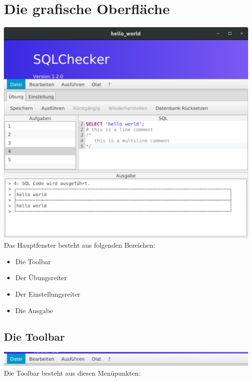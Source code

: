 \documentclass[11pt]{article}
\begin{document}
\clearpage
\section{Die grafische Oberfläche}
\includegraphics[width=1.0\textwidth]{figures/main}
\smallskip
Das Hauptfenster besteht aus folgenden Bereichen:
\begin{itemize}
	\item[\ref{subsec:Toolbar}.] Die Toolbar	
	\item[\ref{subsec:Uebung}.] Der Übungsreiter
	\item[\ref{subsec:Einstellung}.] Der Einstellungsreiter
	\item[\ref{subsec:Ausgabe}.] Die Ausgabe
\end{itemize}
\subsection{Die Toolbar}
\label{subsec:Toolbar}
\includegraphics[width=1.0\textwidth]{figures/toolbar}
Die Toolbar besteht aus diesen Menüpunkten:
\end{document}
